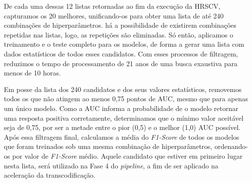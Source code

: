 

De cada uma dessas 12 listas retornadas ao fim da execução da HRSCV, capturamos os 20 melhores, unificando-os para obter uma lista de até 240 combinações de hiperparâmetros. há a possibilidade de existirem combinações repetidas nas listas, logo, as repetições são eliminadas. Só então, aplicamos o treinamento e o teste completo para os modelos, de forma a gerar uma lista com dados estatísticos de todos esses candidatos. Com esses processos de filtragem, reduzimos o tempo de processamento de 21 anos de uma busca exaustiva para menos de 10 horas.

Em posse da lista dos 240 candidatos e dos seus valores estatísticos, removemos todos os que não atingem ao menos 0,75 pontos de AUC, mesmo que para apenas um único modelo. Como a AUC informa a probabilidade de o modelo retornar uma resposta positiva corretamente, determinamos que o mínimo valor aceitável seja de 0,75, por ser a metade entre o pior (0,5) e o melhor (1,0) AUC possível. Após essa filtragem final, calculamos a média do \textit{F1-Score} de todos os modelos que foram treinados sob uma mesma combinação de hiperparâmetros, ordenando-os por valor de \textit{F1-Score} médio. Aquele candidato que estiver em primeiro lugar nesta lista, será utilizado na Fase 4 do \textit{pipeline}, a fim de ser aplicado na aceleração da transcodificação.
